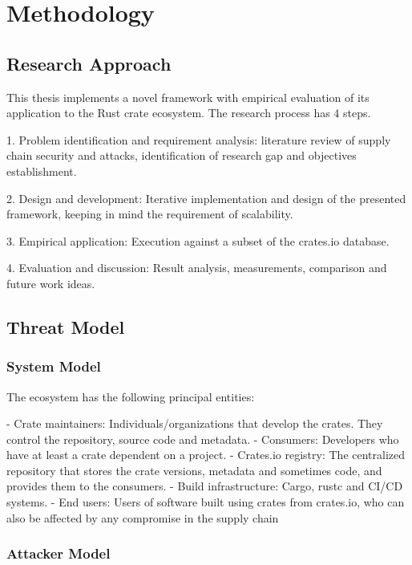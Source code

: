 \chapter{Methodology}\label{chapter:chap3}

\section{Research Approach}\label{sect:research-approach}

This thesis implements a novel framework with empirical evaluation of its application to the Rust crate ecosystem. The research process has 4 steps.

1. Problem identification and requirement analysis: literature review of supply chain security and attacks, identification of research gap and objectives establishment.

2. Design and development: Iterative implementation and design of the presented framework, keeping in mind the requirement of scalability.

3. Empirical application: Execution against a subset of the crates.io database.

4. Evaluation and discussion: Result analysis, measurements, comparison and future work ideas.

\section{Threat Model}\label{sect:threat-model}

\subsection{System Model}\label{subsect:system-model}

The ecosystem has the following principal entities:

- Crate maintainers: Individuals/organizations that develop the crates. They control the repository, source code and metadata.
- Consumers: Developers who have at least a crate dependent on a project.
- Crates.io registry: The centralized repository that stores the crate versions, metadata and sometimes code, and provides them to the consumers.
- Build infrastructure: Cargo, rustc and CI/CD systems.
- End users: Users of software built using crates from crates.io, who can also be affected by any compromise in the supply chain

\subsection{Attacker Model}\label{subsect:attacker-model}

